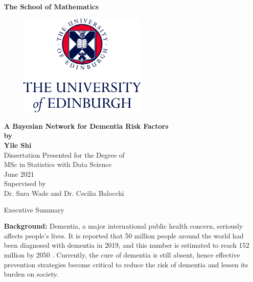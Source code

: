 \documentclass[11pt,twoside]{article}
\numberwithin{Theorem}{section}
\numberwithin{Definition}{section}
\numberwithin{Lemma}{section}
\numberwithin{Algorithm}{section}
\numberwithin{equation}{section}
\begin{document}
	
\pagestyle{empty}

\begin{titlepage}
\vspace*{.5em}
\centering
\textbf{\Large{The School of Mathematics}} \\
\vspace*{1em}
\begin{figure}[!h]
\centering
\includegraphics[width=180pt]{CentredLogoCMYK.jpg}
\end{figure}
\vspace{2em}
\textbf{\Huge{A Bayesian Network for Dementia Risk Factors}}\\[2em]
\textbf{\LARGE{by}}\\
\vspace{2em}
\textbf{\LARGE{Yile Shi}}\\
\vspace{6.5em}
\Large{Dissertation Presented for the Degree of\\
MSc in Statistics with Data Science}\\
\vspace{6.5em}
\Large{June 2021}\\
\vspace{3em}
\Large{Supervised by\\Dr. Sara Wade and Dr. Cecilia Balocchi}
\vfill
\end{titlepage}

\clearpage

\begin{center}
\Large{Executive Summary}
\end{center}

\textbf{Background:} Dementia, a major international public health concern, seriously affects people's lives. It is reported that 50 million people around the world had been diagnosed with dementia in 2019, and this number is estimated to reach 152 million by 2050 \cite{alzheimer2019world}. Currently, the cure of dementia is still absent, hence effective prevention strategies become critical to reduce the risk of dementia and lessen its burden on society. 
\end{document}
